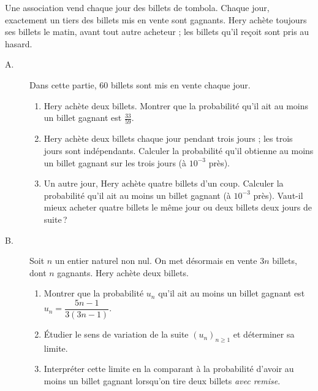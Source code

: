 \begin{exo}\label{exo:proba-18}
Une association vend chaque jour des billets de tombola. Chaque jour, exactement un tiers des billets mis en vente sont gagnants.
Hery ach\`ete toujours ses billets le matin, avant tout autre acheteur ; les billets qu'il re\c{c}oit sont pris au hasard.
\begin{description}
\item[A.] Dans cette partie, $60$ billets sont mis en vente chaque jour.
      \begin{enumerate}
      \item Hery ach\`ete deux billets. Montrer que la probabilit\'e qu'il ait au moins un billet gagnant est $\frac{33}{59}$.
      \item Hery ach\`ete deux billets chaque jour pendant trois jours ; les trois jours sont ind\'ependants.
            Calculer la probabilit\'e qu'il obtienne au moins un billet gagnant sur les trois jours (\`a $10^{-3}$ pr\`es).
      \item Un autre jour, Hery ach\`ete quatre billets d'un coup.
            Calculer la probabilit\'e qu'il ait au moins un billet gagnant (\`a $10^{-3}$ pr\`es).
            Vaut-il mieux acheter quatre billets le m\^eme jour ou deux billets deux jours de suite\,?
      \end{enumerate}
\item[B.] Soit $n$ un entier naturel non nul. On met d\'esormais en vente $3n$ billets, dont $n$ gagnants. Hery ach\`ete deux billets.
      \begin{enumerate}
      \item Montrer que la probabilit\'e $u_n$ qu'il ait au moins un billet gagnant est $u_n = \dfrac{5n-1}{3(3n-1)}$.
      \item \'Etudier le sens de variation de la suite $(u_n)_{n\geq 1}$ et d\'eterminer sa limite.
      \item Interpr\'eter cette limite en la comparant \`a la probabilit\'e d'avoir au moins un billet gagnant
            lorsqu'on tire deux billets \emph{avec remise}.
      \end{enumerate}
\end{description}
\end{exo}
%
